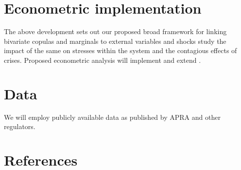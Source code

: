 \documentclass[authoryear]{elsarticle}
\begin{document}
\section{Econometric implementation}

The above development sets out our proposed  broad  framework for linking bivariate copulas and marginals to external variables and shocks study the impact of the same on stresses within the system and the contagious effects of crises.   Proposed econometric analysis will implement and extend  \cite{brownlees2010volatility}.

\section{Data}

We will employ publicly available data as published by APRA and other regulators.

\section*{References}

\end{document}
